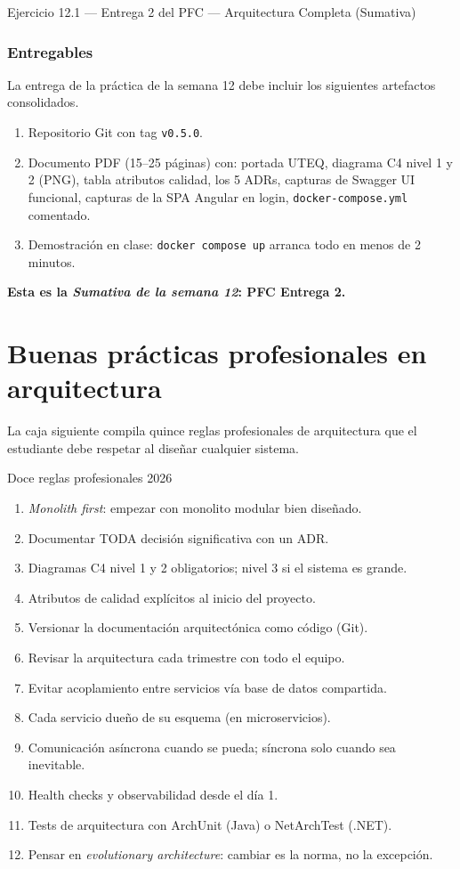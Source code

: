 \documentclass[11pt,a4paper,openany]{book}
\begin{document}
\begin{cajaejercicio}{Ejercicio 12.1 --- Entrega 2 del PFC --- Arquitectura Completa (Sumativa)}
\subsubsection*{Entregables}

La entrega de la práctica de la semana 12 debe incluir los
siguientes artefactos consolidados.


\begin{enumerate}
\item Repositorio Git con tag \texttt{v0.5.0}.
\item Documento PDF (15--25 páginas) con: portada UTEQ, diagrama C4
nivel 1 y 2 (PNG), tabla atributos calidad, los 5 ADRs, capturas de
Swagger UI funcional, capturas de la SPA Angular en login,
\texttt{docker-compose.yml} comentado.
\item Demostración en clase: \texttt{docker compose up} arranca todo
en menos de 2 minutos.
\end{enumerate}

\textbf{Esta es la \emph{Sumativa de la semana 12}: PFC Entrega 2.}
\end{cajaejercicio}

\section{Buenas prácticas profesionales en arquitectura}

La caja siguiente compila quince reglas profesionales de
arquitectura que el estudiante debe respetar al diseñar cualquier
sistema.


\begin{cajabuenas}{Doce reglas profesionales 2026}
\begin{enumerate}
\item \emph{Monolith first}: empezar con monolito modular bien
diseñado.
\item Documentar TODA decisión significativa con un ADR.
\item Diagramas C4 nivel 1 y 2 obligatorios; nivel 3 si el sistema
es grande.
\item Atributos de calidad explícitos al inicio del proyecto.
\item Versionar la documentación arquitectónica como código (Git).
\item Revisar la arquitectura cada trimestre con todo el equipo.
\item Evitar acoplamiento entre servicios vía base de datos
compartida.
\item Cada servicio dueño de su esquema (en microservicios).
\item Comunicación asíncrona cuando se pueda; síncrona solo cuando
sea inevitable.
\item Health checks y observabilidad desde el día 1.
\item Tests de arquitectura con ArchUnit (Java) o NetArchTest (.NET).
\item Pensar en \emph{evolutionary architecture}: cambiar es la
norma, no la excepción.
\end{enumerate}
\end{cajabuenas}
\end{document}
